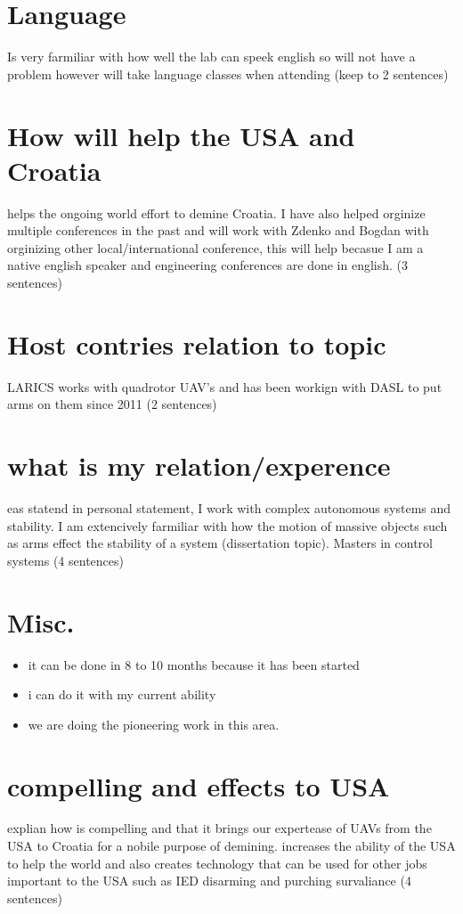 \documentclass[12pt]{article}
\begin{document}
\section{Language}
Is very farmiliar with how well the lab can speek english so will not have a problem however will take language classes when attending (keep to 2 sentences)

\section{How will help the USA and Croatia}
helps the ongoing world effort to demine Croatia.  I have also helped orginize multiple conferences in the past and will work with Zdenko and Bogdan with orginizing other local/international conference, this will help becasue I am a native english speaker and engineering conferences are done in english. (3 sentences)

\section{Host contries relation to topic}
LARICS works with quadrotor UAV's and has been workign with DASL to put arms on them since 2011 (2 sentences)

\section{what is my relation/experence}
eas statend in personal statement, I work with complex autonomous systems and stability.  I am extencively farmiliar with how the motion of massive objects such as arms effect the stability of a system (dissertation topic).  Masters in control systems  (4 sentences)

\section{Misc.}
\begin{itemize}
\item it can be done in 8 to 10 months because it has been started
\item i can do it with my current ability
\item we are doing the pioneering work in this area.
\end{itemize}

\section{compelling and effects to USA}
explian how is compelling and that it brings our expertease of UAVs from the USA to Croatia for a nobile purpose of demining.  increases the ability of the USA to help the world and also creates technology that can be used for other jobs important to the USA such as IED disarming and purching survaliance (4 sentences)
\end{document}
